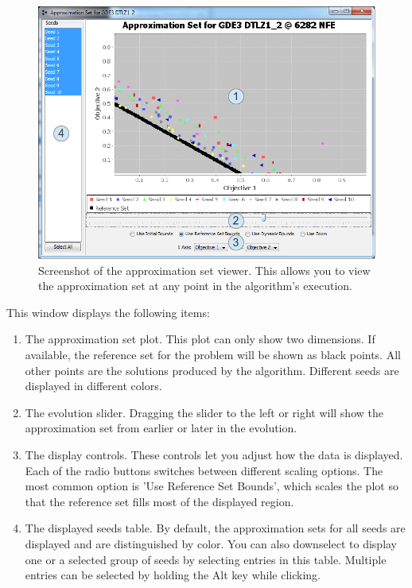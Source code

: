 \begin{figure}
  \includegraphics[width=\linewidth]{approximationSetViewerAnnotated.png}
  \caption{Screenshot of the approximation set viewer.  This allows you to view the approximation set at any point in the algorithm's execution.}
  \label{fig:approximationSetViewerAnnotated}
\end{figure}

This window displays the following items:

\begin{enumerate}
  \item The approximation set plot.  This plot can only show two dimensions.  If available, the reference set for the problem will be shown as black points.  All other points are the solutions produced by the algorithm.  Different seeds are displayed in different colors.
  \item The evolution slider.  Dragging the slider to the left or right will show the approximation set from earlier or later in the evolution.
  \item The display controls.  These controls let you adjust how the data is displayed.  Each of the radio buttons switches between different scaling options.  The most common option is 'Use Reference Set Bounds', which scales the plot so that the reference set fills most of the displayed region.
  \item The displayed seeds table.  By default, the approximation sets for all seeds are displayed and are distinguished by color.  You can also downselect to display one or a selected group of seeds by selecting entries in this table.  Multiple entries can be selected by holding the Alt key while clicking.
\end{enumerate}

